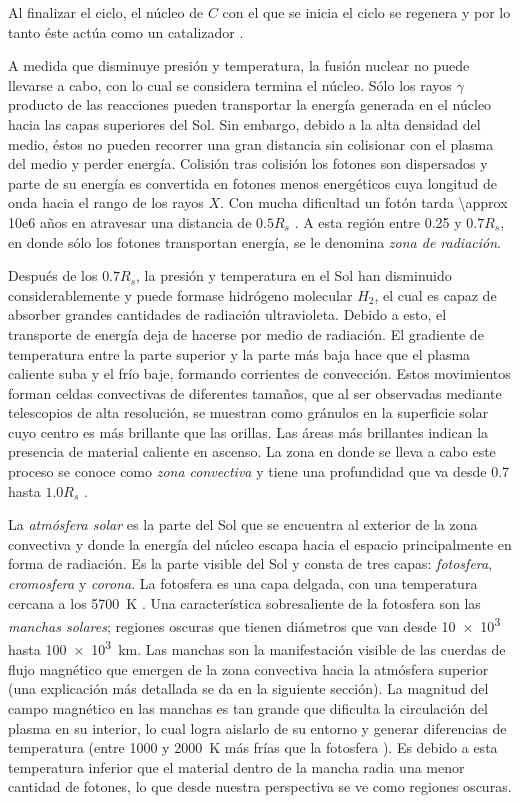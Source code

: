 Al finalizar el ciclo, el núcleo de $C$ con el que se inicia el ciclo se regenera y por lo tanto éste actúa como un catalizador \cite{golub14}.

A medida que disminuye presión y temperatura, la fusión nuclear no puede llevarse a cabo, con lo cual se considera termina el núcleo. Sólo los rayos $\gamma$ producto de las reacciones pueden transportar la energía generada en el núcleo hacia las capas superiores del Sol. Sin embargo, debido a la alta densidad del medio, éstos no pueden recorrer una gran distancia sin colisionar con el plasma del medio y perder energía. Colisión tras colisión los fotones son dispersados y parte de su energía es convertida en fotones menos energéticos cuya longitud de onda hacia el rango de los rayos $X$. Con mucha dificultad un fotón tarda \num{\approx 10e6} años en atravesar una distancia de $\num{0.5}R_{s}$ \cite{fisica13}. A esta región entre \num{0.25} y $\num{0.7}R_{s}$, en donde sólo los fotones transportan energía, se le denomina \emph{zona de radiación}.

Después de los $\num{0.7}R_{s}$, la presión y temperatura en el Sol han disminuido considerablemente y puede formase hidrógeno molecular $H_{2}$, el cual es capaz de absorber grandes cantidades de radiación ultravioleta. Debido a esto, el transporte de energía deja de hacerse por medio de radiación. El gradiente de temperatura entre la parte superior y la parte más baja hace que el plasma caliente suba y el frío baje, formando corrientes de convección. Estos movimientos forman celdas convectivas de diferentes tamaños, que al ser observadas mediante telescopios de alta resolución, se muestran como gránulos en la superficie solar cuyo centro es más brillante que las orillas. Las áreas más brillantes indican la presencia de material caliente en ascenso. La zona en donde se lleva a cabo este proceso se conoce como \emph{zona convectiva} y tiene una profundidad que va desde \num{0.7} hasta $\num{1.0}R_{s}$ .

La \emph{atmósfera solar} es la parte del Sol que se encuentra al exterior de la zona convectiva y donde la energía del núcleo escapa hacia el espacio principalmente en forma de radiación. Es la parte visible del Sol y consta de tres capas: \emph{fotosfera}, \emph{cromosfera} y \emph{corona}. La fotosfera es una capa delgada, con una temperatura cercana a los \SI{5700}{\kelvin} \cite{noyes82}. Una característica sobresaliente de la fotosfera son las \emph{manchas solares}; regiones oscuras que tienen diámetros que van desde \num{10e3} hasta \SI{100e3}{\kilo\metre}. Las manchas son la manifestación visible de las cuerdas de flujo magnético que emergen de la zona convectiva hacia la atmósfera superior (una explicación más detallada se da en la siguiente sección). La magnitud del campo magnético en las manchas es tan grande que dificulta la circulación del plasma en su interior, lo cual logra aislarlo de su entorno y generar diferencias de temperatura (entre \num{1000} y \SI{2000}{\kelvin} más frías que la fotosfera \cite{fisica13}). Es debido a esta temperatura inferior que el material dentro de la mancha radia una menor cantidad de fotones, lo que desde nuestra perspectiva se ve como regiones oscuras.

